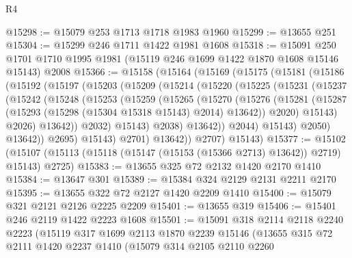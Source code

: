 \begin{lexlean}{R4}
\begin{coremodule}
@15298 := @15079 @253 @1713 @1718 @1983 @1960
@15299 := @13655 @251
@15304 := @15299 @246 @1711 @1422 @1981 @1608
@15318 := @15091
    @250
    @1701
    @1710
    @1995
    @1981
    (@15119 @246 @1699 @1422 @1870 @1608 @15146 @15143)
    @2008
@15366 := @15158
    (@15164
      (@15169
        (@15175
          (@15181
            (@15186
              (@15192
                (@15197
                  (@15203
                    (@15209
                      (@15214
                        (@15220
                          (@15225
                            (@15231
                              (@15237
                                (@15242
                                  (@15248
                                    (@15253
                                      (@15259
                                        (@15265
                                          (@15270
                                            (@15276
                                              (@15281
                                                (@15287
                                                  (@15293
                                                    (@15298 (@15304 @15318 @15143) @2014)
                                                    @13642))
                                                @2020)
                                              @15143)
                                            @2026)
                                          @13642))
                                      @2032)
                                    @15143)
                                  @2038)
                                @13642))
                            @2044)
                          @15143)
                        @2050)
                      @13642))
                  @2695)
                @15143)
              @2701)
            @13642))
        @2707)
      @15143)
@15377 := @15102
    (@15107 (@15113 (@15118 (@15147 (@15153 (@15366 @2713) @13642)) @2719) @15143) @2725)
@15383 := @13655 @325 @72 @2132 @1420 @2170 @1410
@15384 := @13647 @301
@15389 := @15384 @324 @2129 @2131 @2211 @2170
@15395 := @13655 @322 @72 @2127 @1420 @2209 @1410
@15400 := @15079 @321 @2121 @2126 @2225 @2209
@15401 := @13655 @319
@15406 := @15401 @246 @2119 @1422 @2223 @1608
@15501 := @15091
    @318
    @2114
    @2118
    @2240
    @2223
    (@15119
      @317
      @1699
      @2113
      @1870
      @2239
      @15146
      (@13655
        @315
        @72
        @2111
        @1420
        @2237
        @1410
        (@15079
          @314
          @2105
          @2110
          @2260

\end{coremodule}
\end{lexlean}
